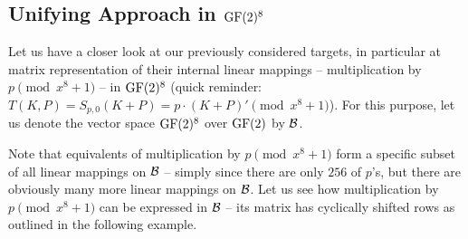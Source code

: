 


\subsection{Unifying Approach in $\mathrm{GF}(2)^8$}
\label{sec:unify}

Let us have a closer look at our previously considered targets, in particular at matrix representation of their internal linear mappings -- multiplication by $p\pmod{x^8+1}$ -- in $\mathrm{GF}(2)^8$ (quick reminder: $T(K,P) = S_{p,0}(K+P) = p \cdot (K+P)' \pmod{x^8+1}$). For this purpose, let us denote the vector space $\mathrm{GF}(2)^8$ over $\mathrm{GF}(2)$ by $\cal B$.

Note that equivalents of multiplication by $p\pmod{x^8+1}$ form a specific subset of all linear mappings on $\cal B$ -- simply since there are only $256$ of $p$'s, but there are obviously many more linear mappings on $\cal B$. Let us see how multiplication by $p\pmod{x^8+1}$ can be expressed in $\cal B$ -- its matrix has cyclically shifted rows as outlined in the following example.

